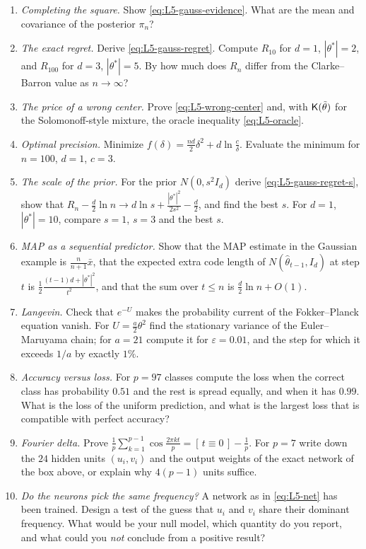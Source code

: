 \begin{exercise}[Problems]
\begin{enumerate}
  \item \emph{Completing the square.} Show \eqref{eq:L5-gauss-evidence}. What are the mean and covariance of the posterior $\pi_n$?
  \item \emph{The exact regret.} Derive \eqref{eq:L5-gauss-regret}. Compute $R_{10}$ for $d=1$, $|\theta^*|=2$, and $R_{100}$ for $d=3$, $|\theta^*|=5$. By how much does $R_n$ differ from the Clarke--Barron value as $n\to\infty$?
  \item \emph{The price of a wrong center.} Prove \eqref{eq:L5-wrong-center} and, with $\mathsf{K}(\tilde\theta)$ for the Solomonoff-style mixture, the oracle inequality \eqref{eq:L5-oracle}.
  \item \emph{Optimal precision.} Minimize $f(\delta)=\frac{nd}2\delta^2+d\ln\frac c\delta$. Evaluate the minimum for $n=100$, $d=1$, $c=3$.
  \item \emph{The scale of the prior.} For the prior $N(0,s^2I_d)$ derive \eqref{eq:L5-gauss-regret-s}, show that $R_n-\frac d2\ln n\to d\ln s+\frac{|\theta^*|^2}{2s^2}-\frac d2$, and find the best $s$. For $d=1$, $|\theta^*|=10$, compare $s=1$, $s=3$ and the best $s$.
  \item \emph{MAP as a sequential predictor.} Show that the MAP estimate in the Gaussian example is $\frac n{n+1}\bar x$, that the expected extra code length of $N(\hat\theta_{t-1},I_d)$ at step $t$ is $\frac12\frac{(t-1)d+|\theta^*|^2}{t^2}$, and that the sum over $t\le n$ is $\frac d2\ln n+O(1)$.
  \item \emph{Langevin.} Check that $e^{-U}$ makes the probability current of the Fokker--Planck equation vanish. For $U=\frac a2\theta^2$ find the stationary variance of the Euler--Maruyama chain; for $a=21$ compute it for $\varepsilon=0.01$, and the step for which it exceeds $1/a$ by exactly $1\%$.
  \item \emph{Accuracy versus loss.} For $p=97$ classes compute the loss when the correct class has probability $0.51$ and the rest is spread equally, and when it has $0.99$. What is the loss of the uniform prediction, and what is the largest loss that is compatible with perfect accuracy?
  \item \emph{Fourier delta.} Prove $\frac1p\sum_{k=1}^{p-1}\cos\frac{2\pi kt}p=[\,t\equiv0\,]-\frac1p$. For $p=7$ write down the $24$ hidden units $(u_i,v_i)$ and the output weights of the exact network of the box above, or explain why $4(p-1)$ units suffice.
  \item \emph{Do the neurons pick the same frequency?} A network as in \eqref{eq:L5-net} has been trained. Design a test of the guess that $u_i$ and $v_i$ share their dominant frequency. What would be your null model, which quantity do you report, and what could you \emph{not} conclude from a positive result?
\end{enumerate}
\end{exercise}

